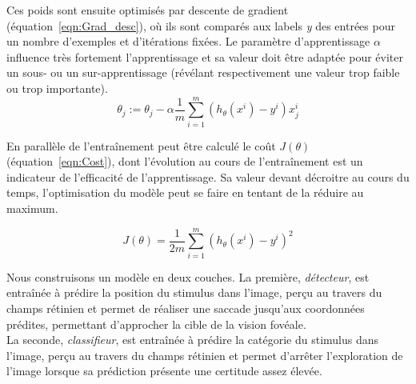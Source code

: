 Ces poids sont ensuite optimisés par descente de gradient (équation~\ref{eqn:Grad_desc}), où ils sont comparés aux labels \textit{y} des entrées pour un nombre d'exemples et d'itérations fixées. Le paramètre d'apprentissage $\alpha$ influence très fortement l'apprentissage et sa valeur doit être adaptée pour éviter un sous- ou un sur-apprentissage (révélant respectivement une valeur trop faible ou trop importante).\\

\begin{equation}
\theta_j := \theta_j - \alpha \frac{1}{m} \sum_{i=1}^m (h_\theta(x^i) - y^i)x_{j}^i
\label{eqn:Grad_desc}
\end{equation}

En parallèle de l'entraînement peut être calculé le coût $J(\theta)$ (équation~\ref{eqn:Cost}), dont l'évolution au cours de l'entraînement est un indicateur de l'efficacité de l'apprentissage. Sa valeur devant décroitre au cours du temps, l'optimisation du modèle peut se faire en tentant de la réduire au maximum.

\begin{equation}
J(\theta) = \frac{1}{2m} \sum_{i=1}^m (h_\theta(x^i)-y^i)^2
\label{eqn:Cost}
\end{equation}

Nous construisons un modèle en deux couches. La première, \textit{détecteur}, est entraînée à prédire la position du stimulus dans l'image, perçu au travers du champs rétinien et permet de réaliser une saccade jusqu'aux coordonnées prédites, permettant d'approcher la cible de la vision fovéale. \\
La seconde, \textit{classifieur}, est entraînée à prédire la catégorie du stimulus dans l'image, perçu au travers du champs rétinien et permet d'arrêter l'exploration de l'image lorsque sa prédiction présente une certitude assez élevée.